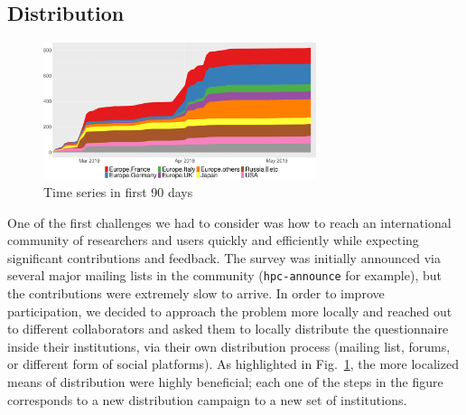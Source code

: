 \documentclass[preprint,5p,times]{elsarticle}
\begin{document}
\subsection*{Distribution}

\begin{figure}[tb]
  \begin{center}
    \includegraphics[width=8.0cm]{R-scripts/TimeSeries.pdf}
    \vspace{-1.5mm}
    \caption{Time series in first 90 days}
    \label{fig:time-series}
\vspace{-3mm}%
  \end{center}%
\end{figure}

One of the first challenges we had to consider was how to reach an
international community of researchers and users quickly and
efficiently while expecting significant contributions and feedback.
%
The survey was initially announced via several major mailing lists in the
community ({\tt hpc-announce} for example), but the contributions were
extremely slow to arrive. In order to improve participation, we decided to
approach the problem more locally and reached out to different collaborators and
asked them to locally distribute the questionnaire inside their institutions,
via their own distribution process (mailing list, forums, or different form of
social platforms). As highlighted in Fig.~\ref{fig:time-series}, the more localized
means of distribution were highly beneficial; each one of the steps in the
figure corresponds to a new distribution campaign to a new set of
institutions.

\end{document}
